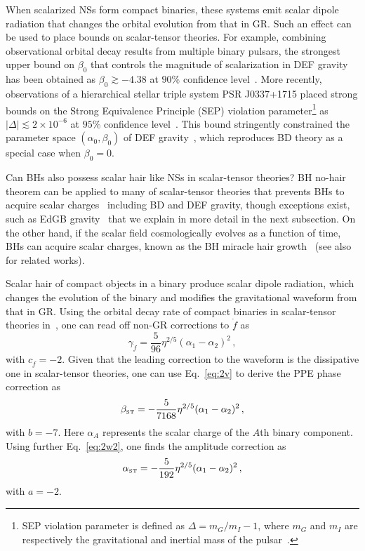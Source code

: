 \documentclass[prd,twocolumn,nofootinbib]{revtex4-1}
\newcommand\be{\begin{equation}}
\newcommand\ee{\end{equation}}
\newcommand{\ST}{{\mbox{\tiny ST}}}
\begin{document}
When scalarized NSs form compact binaries, these systems emit scalar dipole radiation that changes the orbital evolution from that in GR. Such an effect can be used to place bounds on scalar-tensor theories. For example, combining observational orbital decay results from multiple binary pulsars, the strongest upper bound on $\beta_0$ that controls the magnitude of scalarization in DEF gravity has been obtained as $\beta_0\gtrsim -4.38$ at $90\%$ confidence level~\cite{Shao:2017gwu}. More recently, observations of a hierarchical stellar triple system PSR J0337+1715 placed strong bounds on the Strong Equivalence Principle (SEP) violation parameter\footnote{SEP violation parameter is defined as $\Delta=m_G/m_I-1$, where $m_G$ and $m_I$ are respectively the gravitational and inertial mass of the pulsar~\cite{Archibald:2018oxs}.} as $|\Delta|\lesssim 2\times 10^{-6}$ at $95\%$ confidence level~\cite{Archibald:2018oxs}. This bound stringently constrained the parameter space $(\alpha_0,\beta_0)$ of DEF gravity~\cite{PhysRevLett.70.2220,1970ApJ...161.1059N,Bergmann1968,Horbatsch:2010hj,PhysRevD.1.3209}, which reproduces BD theory as a special case when $\beta_0=0$.

Can BHs also possess scalar hair like NSs in scalar-tensor theories? BH no-hair theorem can be applied to many of scalar-tensor theories that prevents BHs to acquire scalar charges~\cite{Hawking:1972qk,Bekenstein:1995un,Sotiriou:2011dz,Hui:2012qt,Maselli:2015yva} including BD and DEF gravity, though exceptions exist, such as EdGB gravity~\cite{Yunes:2011we,Sotiriou:2013qea,Sotiriou:2014pfa,Silva:2017uqg,Doneva:2017bvd} that we explain in more detail in the next subsection. On the other hand, if the scalar field cosmologically evolves as a function of time, BHs can acquire scalar charges, known as the BH miracle hair growth~\cite{Jacobson:1999vr,Horbatsch:2011ye} (see also~\cite{Healy:2011ef,Berti:2013gfa} for related works). 


Scalar hair of compact objects in a binary produce scalar dipole radiation, which changes the evolution of the binary and modifies the gravitational waveform from that in GR. Using the orbital decay rate of compact binaries in scalar-tensor theories in~\cite{Freire:2012mg,Wex:2014nva}, one can read off non-GR corrections to $\dot f$ as
\be
\gamma_{\dot f} = \frac{5}{96} \eta ^{2/5}(\alpha_1-\alpha_2)^2\,,
\ee
with $c_{\dot f} = -2$.
Given that the leading correction to the waveform is the dissipative one in scalar-tensor theories, one can use Eq.~\eqref{eq:2v} to derive the PPE phase correction as
\be\label{eq:betaST}
\beta_{\ST}=-\frac{5}{7168}\eta ^{2/5}(\alpha_1-\alpha_2)^2\,,
\ee
with $b=-7$. Here $\alpha_A$ represents the scalar charge of the $A$th binary component.
Using further Eq.~\eqref{eq:2w2}, one finds the amplitude correction as
\be\label{eq:alphaST}
\alpha_{\ST}=-\frac{5}{192}\eta ^{2/5}(\alpha_1-\alpha_2)^2\,,
\ee
with $a=-2$. 
\end{document}
